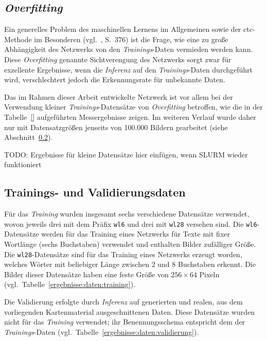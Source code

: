 \subsection{\textit{Overfitting}}
\label{ergebnisse:overfitting}

Ein generelles Problem des maschinellen Lernens im Allgemeinen sowie der \gls{ctc}-Methode im Besonderen
(vgl.~\cite{graves2006}, S.\ 376) ist die Frage, wie eine zu große Abhängigkeit des Netzwerks von den
\textit{Trainings}-Daten vermieden werden kann. Diese \textit{Overfitting} genannte Sichtverengung des Netzwerks sorgt
zwar für exzellente Ergebnisse, wenn die \textit{Inferenz} auf den \textit{Trainings}-Daten durchgeführt wird,
verschlechtert jedoch die Erkennungsrate für unbekannte Daten.

Das im Rahmen dieser Arbeit entwickelte Netzwerk ist vor allem bei der Verwendung kleiner \textit{Trainings}-Datensätze
von \textit{Overfitting} betroffen, wie die in der Tabelle~\ref{} aufgeführten Messergebnisse zeigen. Im weiteren
Verlauf wurde daher nur mit Datensatzgrößen jenseits von 100.000 Bildern gearbeitet (siehe
Abschnitt~\ref{ergebnisse:daten}).

TODO: Ergebnisse für kleine Datensätze hier einfügen, wenn SLURM wieder funktioniert

\subsection{Trainings- und Validierungsdaten}
\label{ergebnisse:daten}

Für das \textit{Training} wurden insgesamt sechs verschiedene Datensätze verwendet, wovon jeweils drei mit dem Präfix
\texttt{wl6} und drei mit \texttt{wl28} versehen sind. Die \texttt{wl6}-Datensätze werden für das Training eines
Netzwerks für Texte mit fixer Wortlänge (sechs Buchstaben) verwendet und enthalten Bilder zufälliger Größe. Die
\texttt{wl28}-Datensätze sind für das Training eines Netzwerks erzeugt worden, welches Wörter mit beliebiger Länge
zwischen 2 und 8 Buchstaben erkennt. Die Bilder dieser Datensätze haben eine feste Größe von $256 \times 64$ Pixeln
(vgl.\ Tabelle~\ref{ergebnisse:daten:training}).

Die Validierung erfolgte durch \textit{Inferenz} auf generierten und realen, aus dem vorliegenden Kartenmaterial
ausgeschnittenen Daten. Diese Datensätze wurden nicht für das \textit{Training} verwendet; ihr Benennungsschema
entspricht dem der \textit{Trainings}-Daten (vgl.\ Tabelle~\ref{ergebnisse:daten:validierung}).

